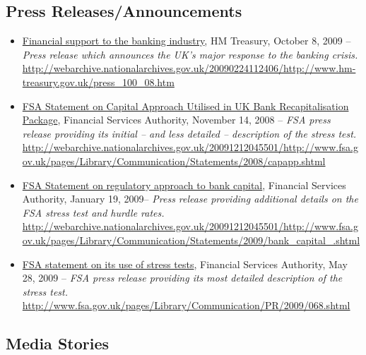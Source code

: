 \subsection{Press Releases/Announcements}

\begin{itemize}
\item
\ul{Financial support to the banking industry}, HM Treasury, October 8, 2009 -- \emph{Press release which
 announces the UK's major response to the banking crisis.} \url{http://webarchive.nationalarchives.gov.uk/20090224112406/http://www.hm-treasury.gov.uk/press_100_08.htm}
\item
\ul{FSA Statement on Capital Approach Utilised in UK Bank Recapitalisation Package}, Financial Services Authority, November 14, 2008 -- \emph{FSA press release providing its initial -- and less detailed -- description of the stress test.} \url{http://webarchive.nationalarchives.gov.uk/20091212045501/http://www.fsa.gov.uk/pages/Library/Communication/Statements/2008/capapp.shtml}
\item
\ul{FSA Statement on regulatory approach to bank capital}, Financial Services Authority, January 19, 2009-- \emph{Press release
 providing additional details on the FSA stress test and hurdle rates.} \url{http://webarchive.nationalarchives.gov.uk/20091212045501/http://www.fsa.gov.uk/pages/Library/Communication/Statements/2009/bank_capital_.shtml}
\item
\ul{FSA statement on its use of stress tests}, Financial Services Authority, May 28, 2009 -- \emph{FSA press release providing its most detailed description of the stress test.} \url{http://www.fsa.gov.uk/pages/Library/Communication/PR/2009/068.shtml}
\end{itemize}

\subsection{Media Stories}


